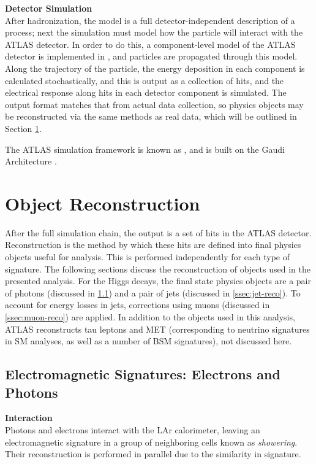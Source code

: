 \noindent\textbf{Detector Simulation}\\
\indent After hadronization, the model is a full detector-independent description of a process; next the simulation must model how the particle will interact with the ATLAS detector. In order to do this, a component-level model of the ATLAS detector is implemented in \GEANTFOUR \cite{geant4}, and particles are propagated through this model. Along the trajectory of the particle, the energy deposition in each component is calculated stochastically, and this is output as a collection of hits, and the electrical response along hits in each detector component is simulated. The output format matches that from actual data collection, so physics objects may be reconstructed via the same methods as real data, which will be outlined in Section \ref{sec:reconstruction}.

The ATLAS simulation framework is known as \ATHENA, and is built on the Gaudi Architecture \cite{gaudi}.

\section{Object Reconstruction} \label{sec:reconstruction}

After the full simulation chain, the output is a set of hits in the ATLAS detector. Reconstruction is the method by which these hits are defined into final physics objects useful for analysis. This is performed independently for each type of signature. The following sections discuss the reconstruction of objects used in the presented analysis. For the Higgs decays, the final state physics objects are a pair of photons (discussed in \ref{ssec:em-signatures}) and a pair of jets (discussed in \ref{ssec:jet-reco}). To account for energy losses in jets, corrections using muons (discussed in \ref{ssec:muon-reco}) are applied. In addition to the objects used in this analysis, ATLAS reconstructs tau leptons and \gls{MET} (corresponding to neutrino signatures in \gls{SM} analyses, as well as a number of \gls{BSM} signatures), not discussed here.

\subsection{Electromagnetic Signatures: Electrons and Photons} \label{ssec:em-signatures} %

\noindent\textbf{Interaction}\\
\indent Photons and electrons interact with the \gls{LAr} calorimeter, leaving an electromagnetic signature in a group of neighboring cells known as \textit{showering}. Their reconstruction is performed in parallel due to the similarity in signature.

